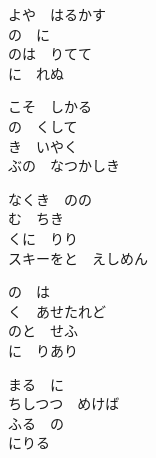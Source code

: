 \documentclass[10pt,b5j]{tarticle} %
\begin{document}
\vspace{1.5em} %
\newcommand{\linespace}{0.5em} %
\newcommand{\blocksize}{0.5\hsize} %
\begin{enumerate} %
    \begin{minipage}[c]{\blocksize}
    
        \vspace{\linespace}
        \item
        よや　はるかす\\
        の　に\\
        のは　りてて\\
        に　れぬ
        
        \vspace{\linespace}
        \item
        こそ　しかる\\
        の　くして\\
        き　いやく\\
        ぶの　なつかしき
        
        \vspace{\linespace}
        \item
        なくき　のの\\
        む　ちき\\
        くに　りり\\
        スキーをと　えしめん
        
        \vspace{\linespace}
        \item
        の　は\\
        く　あせたれど\\
        のと　せふ\\
        に　りあり
        
        \vspace{\linespace}
        \item
        まる　に\\
        ちしつつ　めけば\\
        ふる　の\\
        にりる　
        

\end{minipage}
\end{enumerate}
\end{document}
